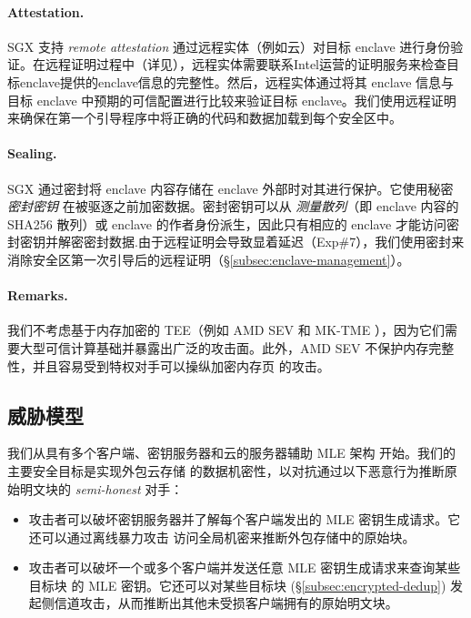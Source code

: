 \paragraph{Attestation.} SGX 支持 {\em remote attestation} 通过远程实体（例如云）对目标 enclave 进行身份验证。在远程证明过程中（详见\cite{sgx}），远程实体需要联系Intel运营的证明服务来检查目标enclave提供的enclave信息的完整性。然后，远程实体通过将其 enclave 信息与目标 enclave 中预期的可信配置进行比较来验证目标 enclave。我们使用远程证明来确保在第一个引导程序中将正确的代码和数据加载到每个安全区中。

\paragraph{Sealing.} SGX 通过密封将 enclave 内容存储在 enclave 外部时对其进行保护。它使用秘密 {\em 密封密钥} 在被驱逐之前加密数据。密封密钥可以从 {\em 测量散列}（即 enclave 内容的 SHA256 散列）或 enclave 的作者身份派生，因此只有相应的 enclave 才能访问密封密钥并解密密封数据.由于远程证明会导致显着延迟（Exp\#7），我们使用密封来消除安全区第一次引导后的远程证明（\S\ref{subsec:enclave-management}）。

\paragraph{Remarks.} 我们不考虑基于内存加密的 TEE（例如 AMD SEV \cite{Amdsev} 和 MK-TME \cite{Mktem}），因为它们需要大型可信计算基础并暴露出广泛的攻击面\cite{mofrad18}。此外，AMD SEV \cite{Amdsev} 不保护内存完整性，并且容易受到特权对手可以操纵加密内存页 \cite{mofrad18} 的攻击。

\subsection{威胁模型}
\label{subsec:threat}

 我们从具有多个客户端、密钥服务器和云的服务器辅助 MLE 架构 \cite{bellare13b} 开始。我们的主要安全目标是实现外包云存储 \cite{bellare13b} 的数据机密性，以对抗通过以下恶意行为推断原始明文块的 {\em semi-honest} 对手：

\begin{itemize}[leftmargin=*]
\item 攻击者可以破坏密钥服务器并了解每个客户端发出的 MLE 密钥生成请求。它还可以通过离线暴力攻击 \cite{bellare13b} 访问全局机密来推断外包存储中的原始块。
    \item 攻击者可以破坏一个或多个客户端并发送任意 MLE 密钥生成请求来查询某些目标块 \cite{bellare13b} 的 MLE 密钥。它还可以对某些目标块 \cite{harnik10} (\S\ref{subsec:encrypted-dedup}) 发起侧信道攻击，从而推断出其他未受损客户端拥有的原始明文块。
\end{itemize}

